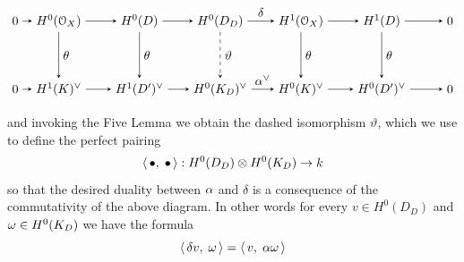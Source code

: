 	\begin{equation}\label{eq:diagram}
		\begin{tikzpicture}[node distance=6.5em, auto]
			\node 					(01) 																{$0$};
			\node 					(A) 	[right of=01, xshift=-3em]		{$H^0(\OX)$};
			\node 					(B) 	[right of=A, xshift=-0em]			{$H^0(D)$};
			\node 					(C) 	[right of=B]									{$H^0(D_D)$};
			\node 					(D) 	[right of=C]									{$H^1(\OX)$};
		  \node 					(E) 	[right of=D]									{$H^1(D)$};
			\node 					(02) 	[right of=E, xshift=-1em]			{$0$};
			\node 					(01') [below of=01, yshift=1em]		{$0$};
			\node 					(A') 	[right of=01', xshift=-3em]		{$H^1(K)^{\vee}$};
			\node 					(B') 	[right of=A', xshift=-0em]		{$H^1(D')^{\vee}$};
			\node 					(C') 	[right of=B']									{$H^0(K_D)^{\vee}$};
			\node 					(D') 	[right of=C']									{$H^0(K)^{\vee}$};
		  \node 					(E') 	[right of=D']									{$H^0(D')^{\vee}$};
			\node 					(02') [right of=E', xshift=-1em]		{$0$};
		  \draw[-stealth]	(01)		to node {$\;$} 		(A);
		  \draw[-stealth]	(A)			to node {$\;$} 		(B);
		  \draw[-stealth]	(B)			to node {$\;$}	 	(C);
		  \draw[-stealth]	(C)			to node {$\delta$}(D);
		  \draw[-stealth]	(D)			to node {$\;$} 		(E);
		  \draw[-stealth]	(E)			to node {$\;$} 		(02);
		  \draw[-stealth][swap]	(01')		to node {$\;$} 		(A');
		  \draw[-stealth][swap]	(A')		to node {$\;$} 		(B');
		  \draw[-stealth][swap]	(B')		to node {$\;$}	 	(C');
		 	\draw[-stealth][]	(C')				to node {$\al^{\vee}$} 	(D');
		  \draw[-stealth][swap]	(D')		to node {$\;$} 		(E');
		  \draw[-stealth][swap]	(E')		to node {$\;$} 		(02');
		  \draw[-stealth]	(A)							to node {$\theta$} 		(A');
		  \draw[-stealth]	(B)							to node {$\theta$}	 	(B');
		  \draw[-stealth, dashed]	(C)			to node {$\vartheta$} 		(C');
		  \draw[-stealth]	(D)							to node {$\theta$} 	(D');
		  \draw[-stealth]	(E)							to node {$\theta$} 		(E');
		\end{tikzpicture}
	\end{equation}
	and invoking the Five Lemma we obtain the dashed isomorphism $\vartheta$, which we use to define the perfect pairing
	$$ \langle\,\bullet,\;\bullet\,\rangle : H^0(D_D)\otimes H^0(K_D) \to k $$
	so that the desired duality between $\alpha$ and $\delta$ is a consequence of the commutativity of the above diagram. In other words for every $ v\in H^0(D_D)$ and $\omega\in H^0(K_D)$ we have the formula
	\begin{equation}\label{eq:deltalpha}
		\langle\, \delta v,\; \omega \,\rangle = \langle\, v,\; \alpha \omega \,\rangle
	\end{equation}

